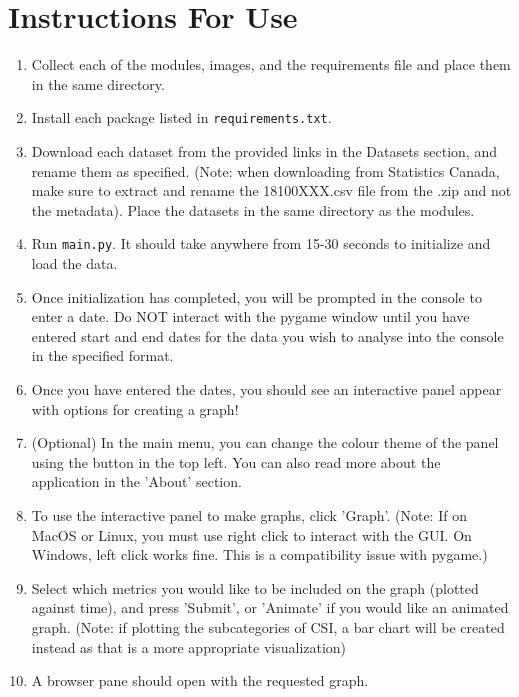 \documentclass[fontsize=11pt]{article}
\begin{document}
\section*{Instructions For Use}
\begin{enumerate}
\item Collect each of the modules, images, and the requirements file and place them in the same directory.
\item Install each package listed in \texttt{requirements.txt}.
\item Download each dataset from the provided links in the Datasets section, and rename them as specified. (Note: when downloading from Statistics Canada, make sure to extract and rename the 18100XXX.csv file from the .zip and not the metadata). Place the datasets in the same directory as the modules.
\item Run \texttt{main.py}. It should take anywhere from 15-30 seconds to initialize and load the data.
\item Once initialization has completed, you will be prompted in the console to enter a date. Do NOT interact with the pygame window until you have entered start and end dates for the data you wish to analyse into the console in the specified format.
\item Once you have entered the dates, you should see an interactive panel appear with options for creating a graph!
\item (Optional) In the main menu, you can change the colour theme of the panel using the button in the top left. You can also read more about the application in the 'About' section.
\item To use the interactive panel to make graphs, click 'Graph'. (Note: If on MacOS or Linux, you must use right click to interact with the GUI. On Windows, left click works fine. This is a compatibility issue with pygame.)
\item Select which metrics you would like to be included on the graph (plotted against time), and press 'Submit', or 'Animate' if you would like an animated graph. (Note: if plotting the subcategories of CSI, a bar chart will be created instead as that is a more appropriate visualization) 
\item A browser pane should open with the requested graph.
\end{enumerate}
\end{document}
